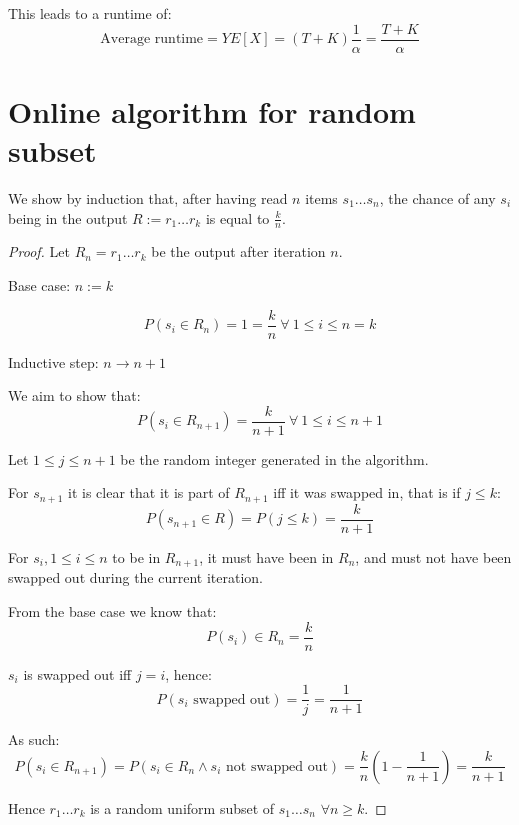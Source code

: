 \documentclass[a4paper]{scrreprt}
\begin{document}
This leads to a runtime of:
\[
  \text{Average runtime} = Y E[X] = (T + K) \frac{1}{\alpha} = \frac{T + K}{\alpha}
\]

\section{Online algorithm for random subset}

We show by induction that, after having read $n$ items $s_1 \ldots s_n$, the
chance of any $s_i$ being in the output $R := r_1 \ldots r_k$ is equal to
$\frac{k}{n}$.

\begin{proof}

  Let $R_n = r_1 \ldots r_k$ be the output after iteration $n$.

  Base case: $n := k$

  \[
    P(s_i \in R_n) = 1 = \frac{k}{n}\ \forall\ 1 \leq i \leq n = k
  \]

  Inductive step: $n \rightarrow n + 1$

  We aim to show that:
  \[
    P(s_i \in R_{n+1}) = \frac{k}{n+1}\ \forall\ 1 \leq i \leq n+1
  \]

  Let $1 \leq j \leq n+1$ be the random integer generated in the algorithm.

  For $s_{n+1}$ it is clear that it is part of $R_{n+1}$ iff it was swapped in,
  that is if $j \leq k$:
  \[
    P(s_{n+1} \in R) = P(j \leq k) = \frac{k}{n+1}
  \]

  For $s_i, 1 \leq i \leq n$ to be in $R_{n+1}$, it must have been in $R_{n}$,
  and must not have been swapped out during the current iteration.

  From the base case we know that:
  \[
    P(s_i) \in R_n = \frac{k}{n}
  \]

  $s_i$ is swapped out iff $j = i$, hence:
  \[
    P(s_i \text{ swapped out}) = \frac{1}{j} = \frac{1}{n+1}
  \]

  As such:
  \[
    P(s_i \in R_{n+1}) = P(s_i \in R_n \land s_i \text{ not swapped out}) = \frac{k}{n} \left(1 - \frac{1}{n+1}\right) = \frac{k}{n+1}
  \]

  Hence $r_1 \ldots r_k$ is a random uniform subset of $s_1 \ldots s_n$ $\forall n \geq k$.
\end{proof}
\end{document}
